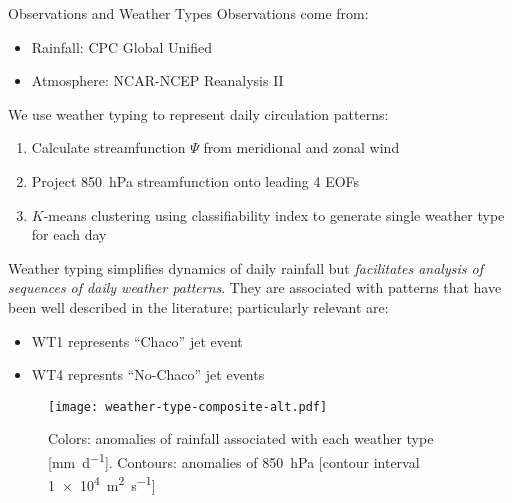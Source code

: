 \begin{block}{Observations and Weather Types}
  Observations come from:
  \begin{itemize}
    \item Rainfall: CPC Global Unified \cite{xie2010cpc}
    \item Atmosphere: NCAR-NCEP Reanalysis II \cite{Kanamitsu:2002kk}
  \end{itemize}
  We use weather typing \cite{Munoz2015} to represent daily circulation patterns:
  \begin{enumerate}
    \item Calculate streamfunction $\Psi$ from meridional and zonal wind \cite{Dawson:2016ge}
    \item Project \SI{850}{\hecto\pascal} streamfunction onto leading 4 EOFs
    \item $K$-means clustering using classifiability index \cite{Michelangeli1995} to generate single weather type for each day
  \end{enumerate}
  Weather typing simplifies dynamics of daily rainfall but \emph{facilitates analysis of sequences of daily weather patterns}.
  They are associated with patterns that have been well described in the literature; particularly relevant are:
  \begin{itemize}
    \item WT1 represents ``Chaco'' jet event \cite{Salio:2002ev}
    \item WT4 represnts ``No-Chaco'' jet events \cite{Vera:2006ib}
  \end{itemize}
  \begin{mdframed}
  \begin{figure}
  	\noindent\texttt{[image: weather-type-composite-alt.pdf]}
  	\caption{
  		Colors: anomalies of rainfall associated with each weather type [\si{\milli\meter\per\day}].
      Contours: anomalies of \SI{850}{\hecto\pascal} [contour interval \SI{1e4}{\meter\squared\per\second}]
  	}
    \label{fig:weather-types}
  \end{figure}
  \end{mdframed}
\end{block}
